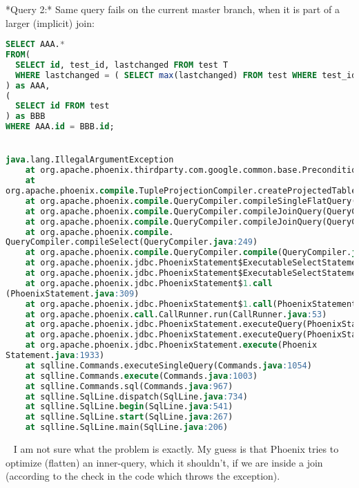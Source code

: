 \documentclass{report}%
\begin{document}
*Query 2:* Same query fails on the current master branch, when it is part of a larger (implicit) join:\newline%
\begin{lstlisting}[language=sql]
SELECT AAA.*
FROM(
  SELECT id, test_id, lastchanged FROM test T
  WHERE lastchanged = ( SELECT max(lastchanged) FROM test WHERE test_id = T.test_id )
) as AAA,
(
  SELECT id FROM test
) as BBB
WHERE AAA.id = BBB.id;


java.lang.IllegalArgumentException
	at org.apache.phoenix.thirdparty.com.google.common.base.Preconditions.checkArgument(Preconditions.java:128)
	at 
org.apache.phoenix.compile.TupleProjectionCompiler.createProjectedTable(TupleProjectionCompiler.java:66)
	at org.apache.phoenix.compile.QueryCompiler.compileSingleFlatQuery(QueryCompiler.java:663)
	at org.apache.phoenix.compile.QueryCompiler.compileJoinQuery(QueryCompiler.java:404)
	at org.apache.phoenix.compile.QueryCompiler.compileJoinQuery(QueryCompiler.java:302)
	at org.apache.phoenix.compile.
QueryCompiler.compileSelect(QueryCompiler.java:249)
	at org.apache.phoenix.compile.QueryCompiler.compile(QueryCompiler.java:176)
	at org.apache.phoenix.jdbc.PhoenixStatement$ExecutableSelectStatement.compilePlan(PhoenixStatement.java:504)
	at org.apache.phoenix.jdbc.PhoenixStatement$ExecutableSelectStatement.compilePlan(PhoenixStatement.java:467)
	at org.apache.phoenix.jdbc.PhoenixStatement$1.call
(PhoenixStatement.java:309)
	at org.apache.phoenix.jdbc.PhoenixStatement$1.call(PhoenixStatement.java:298)
	at org.apache.phoenix.call.CallRunner.run(CallRunner.java:53)
	at org.apache.phoenix.jdbc.PhoenixStatement.executeQuery(PhoenixStatement.java:297)
	at org.apache.phoenix.jdbc.PhoenixStatement.executeQuery(PhoenixStatement.java:290)
	at org.apache.phoenix.jdbc.PhoenixStatement.execute(Phoenix
Statement.java:1933)
	at sqlline.Commands.executeSingleQuery(Commands.java:1054)
	at sqlline.Commands.execute(Commands.java:1003)
	at sqlline.Commands.sql(Commands.java:967)
	at sqlline.SqlLine.dispatch(SqlLine.java:734)
	at sqlline.SqlLine.begin(SqlLine.java:541)
	at sqlline.SqlLine.start(SqlLine.java:267)
	at sqlline.SqlLine.main(SqlLine.java:206)
\end{lstlisting} \ \newline%
I am not sure what the problem is exactly. My guess is that Phoenix tries to optimize (flatten) an inner{-}query, which it shouldn't, if we are inside a join (according to the check in the code which throws the exception).\newline%
\newline%
\end{document}
